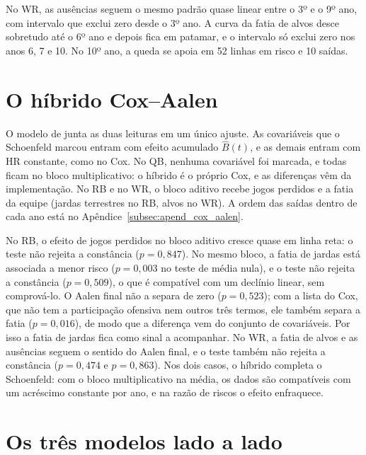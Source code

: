 No WR, as ausências seguem o mesmo padrão quase linear entre o 3º e o 9º ano, com intervalo que exclui zero desde o 3º ano. A curva da fatia de alvos desce sobretudo até o 6º ano e depois fica em patamar, e o intervalo só exclui zero nos anos 6, 7 e 10. No 10º ano, a queda se apoia em 52 linhas em risco e 10 saídas.


\section{O híbrido Cox--Aalen}
\label{sec:res_coxaalen}

O modelo de \citet{scheike2002} junta as duas leituras em um único ajuste. As covariáveis que o Schoenfeld marcou entram com efeito acumulado $\hat B(t)$, e as demais entram com HR constante, como no Cox. No QB, nenhuma covariável foi marcada, e todas ficam no bloco multiplicativo: o híbrido é o próprio Cox, e as diferenças vêm da implementação. No RB e no WR, o bloco aditivo recebe jogos perdidos e a fatia da equipe (jardas terrestres no RB, alvos no WR). A ordem das saídas dentro de cada ano está no Apêndice~\ref{subsec:apend_cox_aalen}.

No RB, o efeito de jogos perdidos no bloco aditivo cresce quase em linha reta: o teste não rejeita a constância ($p=0{,}847$). No mesmo bloco, a fatia de jardas está associada a menor risco ($p=0{,}003$ no teste de média nula), e o teste não rejeita a constância ($p=0{,}509$), o que é compatível com um declínio linear, sem comprová-lo. O Aalen final não a separa de zero ($p=0{,}523$); com a lista do Cox, que não tem a participação ofensiva nem outros três termos, ele também separa a fatia ($p=0{,}016$), de modo que a diferença vem do conjunto de covariáveis. Por isso a fatia de jardas fica como sinal a acompanhar. No WR, a fatia de alvos e as ausências seguem o sentido do Aalen final, e o teste também não rejeita a constância ($p=0{,}474$ e $p=0{,}863$). Nos dois casos, o híbrido completa o Schoenfeld: com o bloco multiplicativo na média, os dados são compatíveis com um acréscimo constante por ano, e na razão de riscos o efeito enfraquece.

\section{Os três modelos lado a lado}
\label{sec:res_lado}


